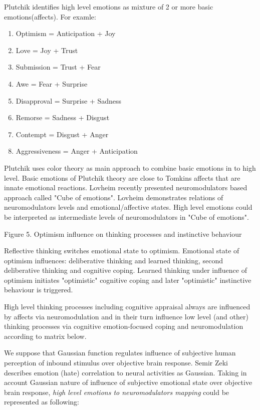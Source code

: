 Plutchik identifies high level emotions \cite{natureofemotions} as mixture of 2 or more basic emotions(affects). For examle:

\begin{enumerate}
	\item  Optimism =	Anticipation + Joy
	\item  Love =	Joy + Trust
	\item  Submission = Trust + Fear
	\item  Awe = Fear + Surprise
	\item  Disapproval = Surprise + Sadness
	\item  Remorse = Sadness + Disgust
	\item  Contempt = Disgust + Anger
	\item  Aggressiveness =	Anger + Anticipation
\end{enumerate}

Plutchik uses color theory as main approach to combine basic emotions in to high level. Basic emotions of Plutchik theory are close to Tomkins affects that are innate emotional reactions. Lovheim recently presented neuromodulators based approach called "Cube of emotions"\cite{cubeofemotions}. Lovheim demonstrates relations of neuromodulators levels and emotional/affective states. High level emotions could be interpreted as intermediate levels of neuromodulators in "Cube of emotions"\cite{cubeofemotions}.

\begin{enumerate}
Figure 5. Optimism influence on thinking processes and instinctive behaviour
\end{enumerate}

Reflective thinking switches emotional state to optimism. Emotional state of optimism influences: deliberative thinking and learned thinking, second deliberative thinking and cognitive coping. Learned thinking under influence of optimism initiates "optimistic" cognitive coping and later "optimistic" instinctive behaviour is triggered.

High level thinking processes including cognitive appraisal always are influenced by affects via neuromodulation and in their turn influence low level (and other) thinking processes via cognitive emotion-focused coping and neuromodulation according to matrix below.

We suppose that Gaussian function regulates influence of subjective human perception of inbound stimulus over objective brain response. Semir Zeki \cite{neuralcorrelatesofhate} describes emotion (hate) correlation to neural activities as Gaussian. Taking in account Gaussian nature of influence of subjective emotional state over objective brain response, \emph{high level emotions to neuromodulators mapping} could be represented as following:

